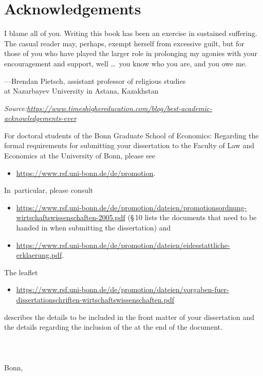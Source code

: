 \chapter{Acknowledgements}


I blame all of you. Writing this book has been an exercise in sustained suffering. The casual reader may, perhaps, exempt herself from excessive guilt, but for those of you who have played the larger role in prolonging my agonies with your encouragement and support, well \dots\ you know who you are, and you owe me.%

\RaggedLeft
---Brendan Pietsch, assistant professor of religious studies \\
at Nazarbayev University in Astana, Kazakhstan

\medskip

\textit{Source:\:\url{https://www.timeshighereducation.com/blog/best-academic-acknowledgements-ever}}

\justifying

\bigskip

\noindent%
For doctoral students of the Bonn Graduate School of Economics: Regarding the formal requirements for submitting your dissertation to the Faculty of Law and Economics at the University of Bonn, please see
\begin{itemize}
	\item \url{https://www.rsf.uni-bonn.de/de/promotion}.
\end{itemize}  In~particular, please consult
\begin{itemize}
	\item \url{https://www.rsf.uni-bonn.de/de/promotion/dateien/promotionsordnung-wirtschaftswissenschaften-2005.pdf} (\S\,10 lists the documents that need to be handed in when submitting the dissertation) and
	\item \url{https://www.rsf.uni-bonn.de/de/promotion/dateien/eidesstattliche-erklaerung.pdf}.
\end{itemize}
The leaflet
\begin{itemize}
	\item \url{https://www.rsf.uni-bonn.de/de/promotion/dateien/vorgaben-fuer-dissertationschriften-wirtschaftswissenschaften.pdf}
\end{itemize}
describes the details to be included in the front matter of your dissertation and the details regarding the inclusion of the  at the end of the document.
\\
\\
\\
\dissauthor \\
Bonn, \disssubmitdate